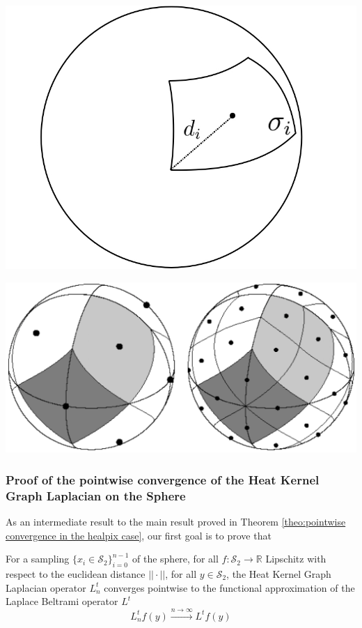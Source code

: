\begin{minipage}{.5\textwidth}
	\centering
	\includegraphics[width=0.4\linewidth]{figs/chapter1/d_iA_i.jpg}
	\label{fig:Geometric characteristics of a patch}
\end{minipage}%
\begin{minipage}{.5\textwidth}
	\centering
	\includegraphics[width=0.7\linewidth]{figs/chapter1/Heal_Base.png}
	\label{fig:HEALPix equal areas patches}
	\vspace{0.5cm}
\end{minipage}

\subsubsection{Proof of the pointwise convergence of the Heat Kernel Graph Laplacian on the Sphere}

As an intermediate result to the main result proved in Theorem \ref{theo:pointwise convergence in the healpix case}, our first goal is to prove that 
\vspace{0.5cm}
\begin{prop}\label{prop:1}
	For a sampling $\{x_i\in\mathcal S_2\}_{i=0}^{n-1}$ of the sphere, for all $f: \mathcal S_2 \rightarrow \mathbb R$ Lipschitz with respect to the euclidean distance $||\cdot||$, for all $y\in\mathcal S_2$, the Heat Kernel Graph Laplacian operator $L^t_n$ converges pointwise to the functional approximation of the Laplace Beltrami operator $L^t$
	$$ L_n^tf(y)\xrightarrow{n\to\infty} L^tf(y)$$
\end{prop} 
\vspace{0.5cm}


